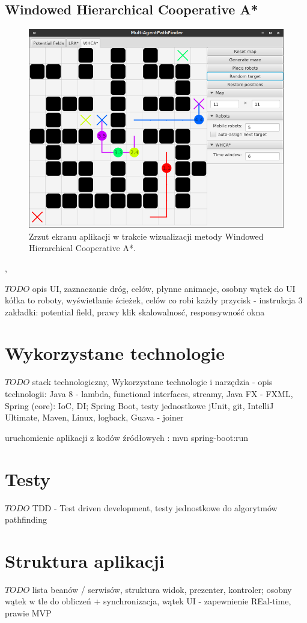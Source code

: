\subsection{Windowed Hierarchical Cooperative A*}

\begin{figure}
	\centering
	\includegraphics[width=0.8\columnwidth]{img/robopath/ui-whca}
	\caption{Zrzut ekranu aplikacji w trakcie wizualizacji metody Windowed Hierarchical Cooperative A*.}
	\label{fig:robopath-ui-whca}
\end{figure},


$TODO$ opis UI, zaznaczanie dróg, celów, płynne animacje, osobny wątek do UI
kółka to roboty, wyświetlanie ścieżek, celów
co robi każdy przycisk - instrukcja
3 zakładki: potential field, 
prawy klik
skalowalnosć, responsywność okna

\section{Wykorzystane technologie}
$TODO$ stack technologiczny, Wykorzystane technologie i narzędzia - opis technologii:
Java 8 - lambda, functional interfaces, streamy,
Java FX - FXML, Spring (core): IoC, DI; Spring Boot, testy jednostkowe jUnit, git, IntelliJ Ultimate, Maven, Linux, logback, Guava - joiner

uruchomienie aplikacji z kodów źródłowych : mvn spring-boot:run

\section{Testy}
$TODO$ TDD - Test driven development, testy jednostkowe do algorytmów pathfinding

\section{Struktura aplikacji}
$TODO$ lista beanów / serwisów, struktura widok, prezenter, kontroler; osobny wątek w tle do obliczeń + synchronizacja, wątek UI - zapewnienie REal-time, prawie MVP


